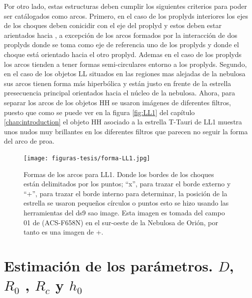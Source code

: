 Por otro lado, estas estructuras deben cumplir los siguientes criterios para poder ser catálogados como arcos. Primero, en el caso de los proplyds interiores los ejes de los choques deben conicidir con el eje del proplyd y estos deben estar arientados hacia \thC, a excepción de los arcos formados por la interacción de dos proplyds donde se toma como eje de referencia uno de los proplyds y donde el choque está orientado hacia el otro proplyd. Ademas en el caso de los proplyds los arcos tienden a tener formas  semi-circulares entorno a los proplyds. Segundo, en el caso de los objetos LL situados en las regiones mas alejadas de la nebulosa sus arcos tienen forma más hiperbólica y están justo en frente de la estrella presecuencia principal orientados hacia el núcleo de la nebulosa. Ahora, para separar los arcos de los objetos HH se usaron imágenes de diferentes filtros, puesto que como se puede ver en la figura \ref{fig:LL1} del capítulo \ref{chap:introduction} el objeto HH asociado a la estrella T-Tauri de LL1 muestra unos nudos muy brillantes en los diferentes filtros que parecen no seguir la forma del arco de proa. 


\begin{figure}
  \centering
   \texttt{[image: figuras-tesis/forma-LL1.jpg]}
  \caption{Formas de los arcos para LL1. Donde los bordes de los choques están delimitados por los puntos; ``x'', para trazar el borde externo y ``+'', para trazar el borde interno para determinar, la posición de la estrella se usaron pequeños círculos o puntos esto se hizo usando las herramientas del ds9 sao image. Esta imagen es tomada del campo 01 de \citet{Bally:2006a} (ACS-F658N) en el sur-oeste de la Nebulosa de Orión, por tanto es una imagen de \ha{}+\nii{}. }
  \label{fig:arco-LL1}
\end{figure}

\section{Estimación de los parámetros. \(D\), \(R_{0}\) , \(R_{c}\) y \(h_{0}\) }
\label{sec:parametros}

